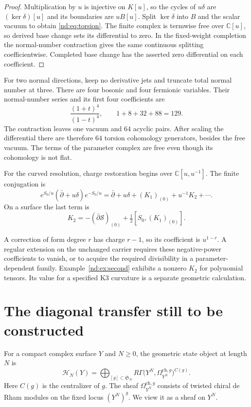 \begin{proof}
Multiplication by $u$ is injective on $K[u]$, so the cycles of
$u\delta$ are $(\ker\delta)[u]$ and its boundaries are $uB[u]$.
Split $\ker\delta$ into $B$ and the scalar vacuum to obtain
\eqref{nd:eq:torsion}. The finite complex is termwise free over
$\mathbb C[u]$, so derived base change sets its differential to zero.
In the fixed-weight completion the normal-number contraction gives
the same continuous splitting coefficientwise. Completed base change
has the asserted zero differential on each coefficient.
\end{proof}

For two normal directions, keep no derivative jets and truncate total
normal number at three. There are four bosonic and four fermionic
variables. Their normal-number series and its first four coefficients are
\[
 \frac{(1+t)^4}{(1-t)^4},\qquad 1+8+32+88=129.
\]
The contraction leaves one vacuum and $64$ acyclic pairs.
After scaling the differential there are therefore $64$ torsion
cohomology generators, besides the free vacuum. The terms of the
parameter complex are free even though its cohomology is not flat.

For the curved resolution, charge restoration begins over
$\mathbb C[u,u^{-1}]$. The finite conjugation is
\begin{equation}\label{nd:eq:homogenized}
 e^{S_0/u}(\bar\partial+u\delta)e^{-S_0/u}
  =\bar\partial+u\delta+(K_1)_{(0)}+u^{-1}K_2+\cdots.
\end{equation}
On a surface the last term is
\[
 K_2=-(\bar\partial\mathscr S)_{(0)}
                   +\tfrac12[S_0,(K_1)_{(0)}].
\]

A correction of form degree $r$ has charge $r-1$, so its coefficient
is $u^{1-r}$. A regular extension on the unchanged carrier requires
these negative-power coefficients to vanish, or to acquire the required
divisibility in a parameter-dependent family.
Example~\ref{nd:ex:second} exhibits a nonzero $K_2$ for polynomial
tensors. Its value for a specified K3 curvature is a separate
geometric calculation.

\section{The diagonal transfer still to be constructed}
\label{nd:sec:comparison}

For a compact complex surface $Y$ and $N\geq0$, the geometric state
object at length $N$ is
\begin{equation}\label{nd:eq:states}
 \mathcal H_N(Y)=
 \bigoplus_{[g]\subset\mathfrak S_N}
 R\Gamma\bigl(Y^N,\Omega_{Y^N}^{\mathrm{ch},g}\bigr)^{C(g)}.
\end{equation}
Here $C(g)$ is the centralizer of $g$. The sheaf
$\Omega_{Y^N}^{\mathrm{ch},g}$ consists of twisted chiral de Rham
modules on the fixed locus $(Y^N)^g$. We view it as a sheaf on $Y^N$.

